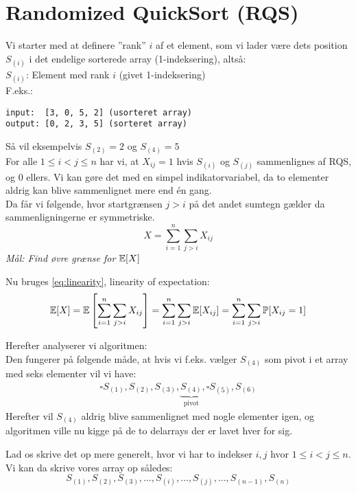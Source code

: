 \section{Randomized QuickSort (RQS)}

Vi starter med at definere ''rank'' $i$ af et element, som vi lader være dets position $S_{(i)}$ i det endelige sorterede array (1-indeksering), altså:\\

$S_{(i)}$: Element med rank $i$ (givet 1-indeksering)\\

F.eks.:
\begin{verbatim}
input:  [3, 0, 5, 2] (usorteret array)
output: [0, 2, 3, 5] (sorteret array)
\end{verbatim}
Så vil eksempelvis $S_{(2)} = 2$ og $S_{(4)} = 5$\\


For alle $1 \leq i < j \leq n$ har vi, at $X_{ij} = 1$ hvis $S_{(i)}$ og $S_{(j)}$ sammenlignes af RQS, og 0 ellers. Vi kan gøre det med en simpel indikatorvariabel, da to elementer aldrig kan blive sammenlignet mere end én gang.\\

Da får vi følgende, hvor startgrænsen $j > i$ på det andet sumtegn gælder da sammenligningerne er symmetriske.
$$
X = \sum_{i=1}^n \sum_{j>i} X_{ij}
$$
\textit{Mål: Find øvre grænse for ${\mathbb E}[X]$}

Nu bruges \cref{eq:linearity}, linearity of expectation:
\begin{align} \label{eq:exp-X}
{\mathbb E}[X] = {\mathbb E} \left[  \sum_{i=1}^n \sum_{j>i} X_{ij} \right] = \sum_{i=1}^n \sum_{j>i} {\mathbb E}[X_{ij}] = \sum_{i=1}^n \sum_{j>i} {\mathbb P}[X_{ij} = 1]
\end{align}

Herefter analyserer vi algoritmen:\\
Den fungerer på følgende måde, at hvis vi f.eks. vælger $S_{(4)}$ som pivot i et array med seks elementer vil vi have:
\begin{align} \label{eq:eksempel}
\square{S_{(1)}, S_{(2)}, S_{(3)},} \underbrace{S_{(4)}}_{\text{pivot}}, \square{ S_{(5)}, S_{(6)}}
\end{align}
Herefter vil $S_{(4)}$ aldrig blive sammenlignet med nogle elementer igen, og algoritmen ville nu kigge på de to delarrays der er lavet hver for sig.


Lad os skrive det op mere generelt, hvor vi har to indekser $i,j$ hvor $1 \leq i < j \leq n$. Vi kan da skrive vores array op således:
$$
S_{(1)}, S_{(2)}, S_{(3)}, \dots, S_{(i)}, \dots, S_{(j)}, \dots, S_{(n-1)}, S_{(n)}
$$

